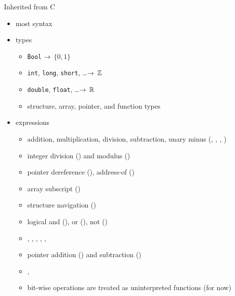 \documentclass[t]{beamer}
\begin{document}



\begin{frame}{Inherited from C}
  \begin{itemize}
  \item most syntax
  \item types
    \begin{itemize}
    \item \texttt{{\U}Bool} $\rightarrow$ $\{0,1\}$
    \item \texttt{int}, \texttt{long}, \texttt{short}, \ldots $\rightarrow$ $\mathbb{Z}$
    \item \texttt{double}, \texttt{float}, \ldots $\rightarrow$ $\mathbb{R}$
    \item structure, array, pointer, and function types
    \end{itemize}
  \item expressions
    \begin{itemize}
    \item addition, multiplication, division, subtraction, unary minus (\code{+}, 
      \code{*}, \code{/}, \code{-})
    \item integer division (\code{/}) and modulus (\code{\%})
    \item pointer dereference (\code{*}), address-of (\code{\&})
    \item array subscript (\code{[...]})
    \item structure navigation ()
    \item logical and (\code{\&\&}), or (\code{||}), not (\code{!})
    \item \code{==}, \code{!=}, \code{<}, \code{>}, \code{<=}, \code{>=}
    \item pointer addition (\code{+}) and subtraction (\code{-})
    \item \code{++}, \code{--}
    \item bit-wise operations are treated as uninterpreted functions (for now)
    \end{itemize}
  \end{itemize}
\end{frame}
\end{document}

